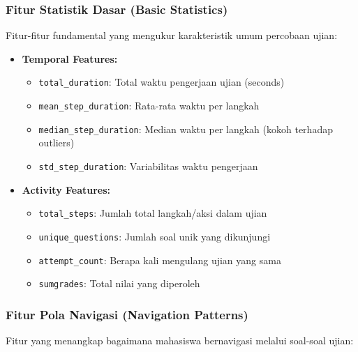 \subsubsection{Fitur Statistik Dasar (Basic Statistics)}
\label{sec:fiturStatistikDasar}

Fitur-fitur fundamental yang mengukur karakteristik umum percobaan ujian:

\begin{itemize}
    \item \textbf{Temporal Features:}
    \begin{itemize}
        \item \texttt{total\_duration}: Total waktu pengerjaan ujian (seconds)
        \item \texttt{mean\_step\_duration}: Rata-rata waktu per langkah
        \item \texttt{median\_step\_duration}: Median waktu per langkah (kokoh terhadap outliers)
        \item \texttt{std\_step\_duration}: Variabilitas waktu pengerjaan
    \end{itemize}
    
    \item \textbf{Activity Features:}
    \begin{itemize}
        \item \texttt{total\_steps}: Jumlah total langkah/aksi dalam ujian
        \item \texttt{unique\_questions}: Jumlah soal unik yang dikunjungi
        \item \texttt{attempt\_count}: Berapa kali mengulang ujian yang sama
        \item \texttt{sumgrades}: Total nilai yang diperoleh
    \end{itemize}
\end{itemize}

\subsubsection{Fitur Pola Navigasi (Navigation Patterns)}
\label{sec:fiturPolaNavigasi}

Fitur yang menangkap bagaimana mahasiswa bernavigasi melalui soal-soal ujian:

